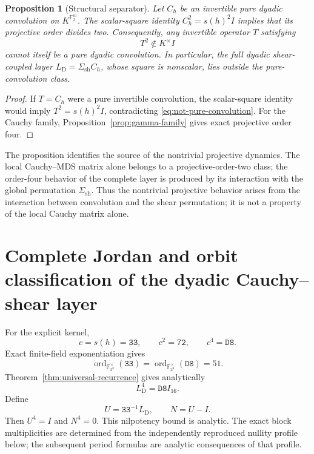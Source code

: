 \documentclass[10pt,reqno]{amsart}
\theoremstyle{plain}
\newtheorem{proposition}[theorem]{Proposition}
\theoremstyle{remark}\newtheorem{remark}[theorem]{Remark}
\theoremstyle{definition}\newtheorem{definition}[theorem]{Definition}
\newcommand{\F}{\mathbb F}
\newcommand{\ord}{\operatorname{ord}}
\newcommand{\hex}[1]{\mathtt{#1}}
\begin{document}
\begin{proposition}[Structural separator]\label{prop:structural-separator}
Let $C_h$ be an invertible pure dyadic convolution on $K^{\F_2^m}$. The scalar-square identity $C_h^2=s(h)^2I$ implies that its projective order divides two. Consequently, any invertible operator $T$ satisfying
\begin{equation}
T^2\notin K^\times I
\label{eq:not-pure-convolution}
\end{equation}
cannot itself be a pure dyadic convolution. In particular, the full dyadic shear-coupled layer $L_{\mathrm{D}}=\Sigma_{\mathrm{sh}}C_h$, whose square is nonscalar, lies outside the pure-convolution class.
\end{proposition}
\begin{proof}
If $T=C_h$ were a pure invertible convolution, the scalar-square identity would imply $T^2=s(h)^2I$, contradicting \eqref{eq:not-pure-convolution}. For the Cauchy family, Proposition~\ref{prop:gamma-family} gives exact projective order four.
\end{proof}

The proposition identifies the source of the nontrivial projective dynamics. The local Cauchy--MDS matrix alone belongs to a projective-order-two class; the order-four behavior of the complete layer is produced by its interaction with the global permutation $\Sigma_{\mathrm{sh}}$. Thus the nontrivial projective behavior arises from the interaction between convolution and the shear permutation; it is not a property of the local Cauchy matrix alone.
\section{Complete Jordan and orbit classification of the dyadic Cauchy--shear layer}
\label{sec:concrete-jordan}
For the explicit kernel,
\[
c=s(h)=\hex{33},\qquad c^2=\hex{72},\qquad c^4=\hex{D8}.
\]
Exact finite-field exponentiation gives
\[
\ord_{\F_{2^8}^\times}(\hex{33})
=
\ord_{\F_{2^8}^\times}(\hex{D8})=51.
\]
Theorem~\ref{thm:universal-recurrence} gives analytically
\begin{equation}
L_{\mathrm{D}}^4=\hex{D8}I_{16}.
\label{eq:L4}
\end{equation}
Define
\[
U=\hex{33}^{-1}L_{\mathrm{D}},\qquad N=U-I.
\]
Then $U^4=I$ and $N^4=0$.  This nilpotency bound is analytic.  The exact block multiplicities are determined from the independently reproduced nullity profile below; the subsequent period formulas are analytic consequences of that profile.
\end{document}
